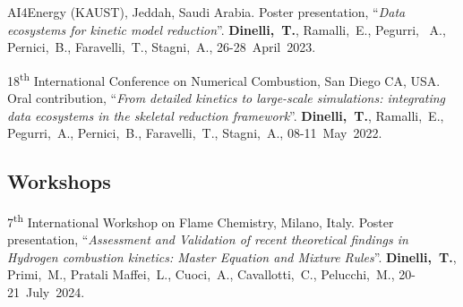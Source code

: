 \begin{etaremune}
   \item
      AI4Energy (KAUST), Jeddah, Saudi Arabia. Poster presentation, ``{\it Data ecosystems for
      kinetic model reduction}''. {\bf Dinelli,~T.}, Ramalli,~E., Pegurri,
      ~A., Pernici,~B., Faravelli,~T., Stagni,~A.,
      26-28~April~2023.

   \item
      18\textsuperscript{th} International Conference on Numerical Combustion, San Diego
      CA, USA. Oral contribution, ``{\it From detailed kinetics to large-scale
      simulations: integrating data ecosystems in the skeletal reduction framework}''.
      {\bf Dinelli,~T.}, Ramalli,~E., Pegurri,~A., Pernici,~B.,
      Faravelli,~T., Stagni,~A.,
      08-11~May~2022.
\end{etaremune}

\subsection{Workshops}
\begin{etaremune}
   \item
      7\textsuperscript{th} International Workshop on Flame Chemistry, Milano, Italy.
      Poster presentation, ``{\it Assessment and Validation of recent theoretical
      findings in Hydrogen combustion kinetics: Master Equation and Mixture Rules}''.
      {\bf Dinelli,~T.}, Primi,~M., Pratali Maffei,~L., Cuoci,~A.,
      Cavallotti,~C., Pelucchi,~M.,
      20-21~July~2024.
\end{etaremune}
